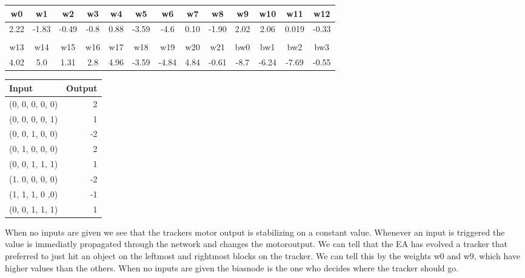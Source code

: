 \begin{tabular}{c | c | c | c | c | c | c | c | c | c | c | c | c }

w0  & w1  & w2  & w3  & w4  & w5  & w6  & w7  & w8  & w9  & w10 & w11 & w12 \\
\hline
2.22 & -1.83 & -0.49 & -0.8 & 0.88 & -3.59 & -4.6 & 0.10 & -1.90 & 2.02 & 2.06 & 0.019 & -0.33 \\ \\

w13 & w14 & w15 & w16 & w17 & w18 & w19 & w20 & w21 & bw0 & bw1 & bw2 & bw3 \\
\hline
4.02 & 5.0 & 1.31 & 2.8 & 4.96 & -3.59 & -4.84 & 4.84 & -0.61 & -8.7 & -6.24 & -7.69 & -0.55 \\

\end{tabular}


\begin{center}
\begin{tabular}{l | r}
	\textbf{Input} & \textbf{Output} \\ \hline
	(0, 0, 0, 0, 0) & 2 \\
    (0, 0, 0, 0, 1) & 1  \\
    (0, 0, 1, 0, 0) & -2 \\
    (0, 1, 0, 0, 0) & 2 \\
    (0, 0, 1, 1, 1) & 1  \\
    (1. 0, 0, 0, 0) & -2 \\
    (1, 1, 1, 0 ,0) & -1 \\
    (0, 0, 1, 1, 1) & 1  \\
\end{tabular}
\end{center}
When no inputs are given we see that the trackers motor output is stabilizing on a constant value. Whenever an input is triggered the value is immediatly propagated through the network and changes the motoroutput. We can tell that the EA has evolved a tracker that preferred to just hit an object on the leftmost and rightmost blocks on the tracker. We can tell this by the weights w0 and w9, which have higher values than the others. When no inputs are given the biasnode is the one who decides where the tracker should go.



